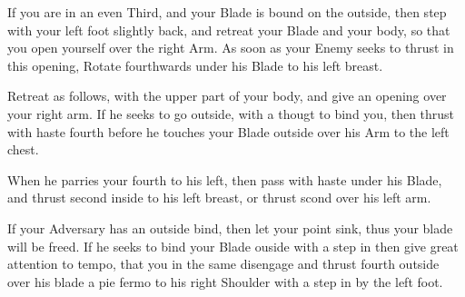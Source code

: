 If you are in an even Third, and your Blade is bound on the outside, then step with your left foot slightly back, and retreat your Blade and your body, so that you open yourself over the right Arm. As soon as your Enemy seeks to thrust in this opening, Rotate fourthwards under his Blade to his left breast.

\exercise{}

Retreat as follows, with the upper part of your body, and give an
opening over your right arm. If he seeks to go outside, with a thougt
to bind you, then thrust with haste fourth before he touches your
Blade outside over his Arm to the left chest.

\exercise{}

When he parries your fourth to his left, then pass with haste under
his Blade, and thrust second inside to his left breast, or thrust
scond over his left arm.

\exercise{}

If your Adversary has an outside bind, then let your point sink, thus
your blade will be freed. If he seeks to bind your Blade ouside with a
step in then give great attention to tempo, that you in the same
disengage and thrust fourth outside over his blade a pie fermo to his
right Shoulder with a step in by the left foot.

\exercise{}

